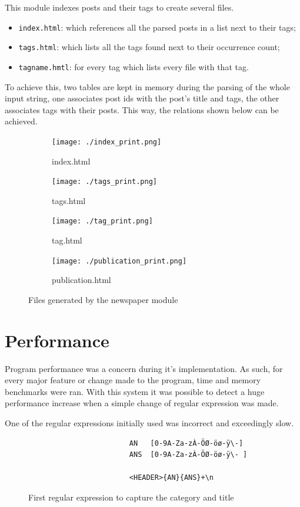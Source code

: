 \documentclass[a4paper]{report}
\begin{document}
This module indexes posts and their tags to create several files.
\begin{itemize}
    \item \texttt{index.html}: which references all the parsed posts in
        a list next to their tags;
    \item \texttt{tags.html}: which lists all the tags found next to
        their occurrence count;
    \item \texttt{tagname.hmtl}: for every tag which lists every file with
        that tag.
\end{itemize}

To achieve this, two tables are kept in memory during the parsing of the whole
input string, one associates post ids with the post's title and tags, the other
associates tags with their posts. This way, the relations shown below can be
achieved.

\begin{figure}[H]
    \centering
    \begin{subfigure}{0.54\textwidth}
        \texttt{[image: ./index\_print.png]}
        \caption{index.html}
    \end{subfigure}
    \begin{subfigure}{0.45\textwidth}
        \texttt{[image: ./tags\_print.png]}
        \caption{tags.html}
    \end{subfigure}
    \begin{subfigure}{0.45\textwidth}
        \texttt{[image: ./tag\_print.png]}
        \caption{tag.html}
    \end{subfigure}
    \begin{subfigure}{0.54\textwidth}
        \texttt{[image: ./publication\_print.png]}
        \caption{publication.html}
    \end{subfigure}
    \caption{Files generated by the newspaper module}
\end{figure}

\chapter{Performance}

Program performance was a concern during it's implementation. As such, for every
major feature or change made to the program, time and memory benchmarks were
ran. With this system it was possible to detect a huge performance increase
when a simple change of regular expression was made.

One of the regular expressions initially used was incorrect and exceedingly slow.
\begin{figure}[H]
    \centering
    \begin{verbatim}
                        AN   [0-9A-Za-zÀ-ÖØ-öø-ÿ\-]
                        ANS  [0-9A-Za-zÀ-ÖØ-öø-ÿ\- ]

                        <HEADER>{AN}{ANS}+\n
    \end{verbatim}
    \caption{First regular expression to capture the category and title}
\end{figure}
\end{document}
